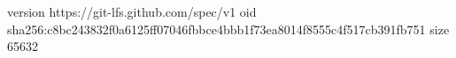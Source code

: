 version https://git-lfs.github.com/spec/v1
oid sha256:c8bc243832f0a6125ff07046fbbce4bbb1f73ea8014f8555c4f517cb391fb751
size 65632
